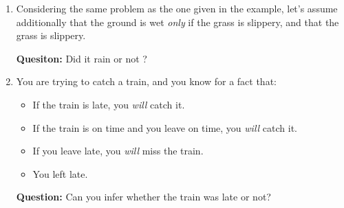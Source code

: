 \documentclass[11pt]{article}
\numberwithin{equation}{section}
\newcommand{\sol}[1]{
    }
\begin{document}
\begin{enumerate}
    \item Considering the same problem as the one given in the example, let's assume additionally that the ground is wet \emph{only} if the grass is slippery, and that the grass is slippery. 
    
    \textbf{Quesiton:} Did it rain or not ?

    \sol{
        On top of knowing that the grass is slippery ($S$), we have a new rule: $S \implies W$.
        We thus know that the ground is wet as well: $W$.

        However, we cannot tell anything about the rain, as the grass being slippery or the ground being wet does not imply anything about the rain: $(S \land W) \centernot\implies R$. 
        We thus cannot say anything about the rain.
    }

    \item You are trying to catch a train, and you know for a fact that:
    \begin{itemize}
        \item If the train is late, you \emph{will} catch it.
        \item If the train is on time and you leave on time, you \emph{will} catch it.
        \item If you leave late, you \emph{will} miss the train.
        \item You left late.
    \end{itemize}
    \textbf{Question:} Can you infer whether the train was late or not?

    \sol{
        \paragraph{Notations}
        \begin{itemize}
            \item The train is on time: $T$.
            \item You left late: $L$.
            \item You catch the train: $C$.
        \end{itemize}

        \paragraph{Knowledge base}
        \begin{enumerate}
            \item If the train is late, you \emph{will} catch it: $\neg T \implies C$.
            \item If the train is on time and you leave on time, you \emph{will} catch it: $(T \land \neg L) \implies C$.
            \item If you leave late, you \emph{will} miss the train: $L \implies \neg C$.
            \item You left late: $L$.
        \end{enumerate}

}
\end{enumerate}
\end{document}
